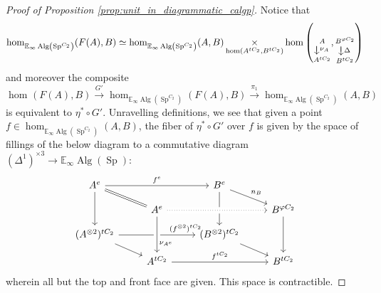 \documentclass{article}
\DeclareMathOperator{\Alg}{Alg}
\DeclareMathOperator{\CAlgp}{CAlg^p} %
\DeclareMathOperator{\Spectra}{Sp} %
\DeclareMathOperator*{\fiberproduct}{\times}
\newcommand{\EE}{\mathbb{E}}
\newcommand{\morphism}[3]{\mathop{\rotatebox{270}{$\xrightarrow{\rotatebox{90}{$\scriptstyle#2$}}$}}\limits^{#1}_{#3}}
\theoremstyle{definition}
\begin{document}
\begin{proof}[Proof of Proposition \ref{prop:unit_in_diagrammatic_calgp}]
    Notice that 
    \begin{equation*}
        \hom_{\EE_\infty\Alg\left(\Spectra^{C_2}\right)}(F(A),B) \simeq \hom_{\EE_\infty\Alg\left(\Spectra^{C_2}\right)}(A,B) \fiberproduct_{\hom\left(A^{tC_2},B^{tC_2}\right) } \hom \left( \morphism{A}{\nu_A}{A^{tC_2}}, \morphism{B^{\varphi C_2}}{\Delta}{B^{tC_2}} \right)
    \end{equation*}
    and moreover the composite
    \begin{equation*}
        \hom_{\CAlgp}(F(A), B) \xrightarrow{G'} \hom_{\EE_\infty\Alg\left(\Spectra^{C_2}\right)}(F(A),B) \xrightarrow{\pi_1} \hom_{\EE_\infty\Alg\left(\Spectra^{C_2}\right)}(A,B)
    \end{equation*}
     is equivalent to $ \eta^* \circ G' $. 
    Unravelling definitions, we see that given a point $ f \in \hom_{\EE_\infty\Alg\left(\Spectra^{C_2}\right)}(A,B) $, the fiber of $ \eta^* \circ G' $ over $ f $ is given by the space of fillings of the below diagram to a commutative diagram $ (\Delta^1)^{\times 3} \to \EE_\infty\Alg(\Spectra) $:  
    \begin{equation*}
    \begin{tikzcd}[row sep=small] %
        A^e \ar[rr,"{f^e}"] \ar[dd] \ar[rd,equals] & & B^e \ar[dd] \ar[rd,"{n_B}"] & \\
            & A^e  \ar[rr, dotted,crossing over] & & B^{\varphi C_2} \ar[dd] \\
        {(A^{\otimes 2})^{tC_2}} \ar[rr,"{(f^{\otimes 2})^{tC_2}}",very near end] \ar[rd] & & {( B^{\otimes 2})^{tC_2}} \ar[rd] & \\
        & A^{tC_2} \ar[rr,"{f^{tC_2}}"] & & B^{tC_2} \ar[from=2-2,to=4-2,crossing over,"{\nu_{A^e}}", near end]
    \end{tikzcd}
    \end{equation*} 
    wherein all but the top and front face are given. 
    This space is contractible. 
\end{proof}
\end{document}
